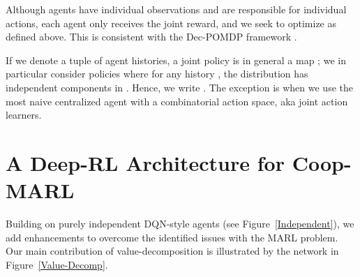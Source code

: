 \documentclass{article}
\begin{document}
Although agents have individual observations and are responsible for individual actions, each agent only receives the joint reward, and we seek to optimize  as defined above. This is consistent with the Dec-POMDP framework \citep{OliehoekSV08, OliehoekAmato16book}. 


If we denote  a tuple of agent histories, a joint policy is in general a map ; we in particular consider policies where for any history , the distribution  has independent components in . Hence, we write  . The exception is when we use the most naive centralized agent with a combinatorial action space, aka joint action learners. 





\section{A Deep-RL Architecture for Coop-MARL}


Building on purely independent DQN-style agents (see Figure~\ref{Independent}), we add enhancements to overcome the identified issues with the MARL problem. Our main contribution of value-decomposition is illustrated by the network in Figure~\ref{Value-Decomp}.
\end{document}
